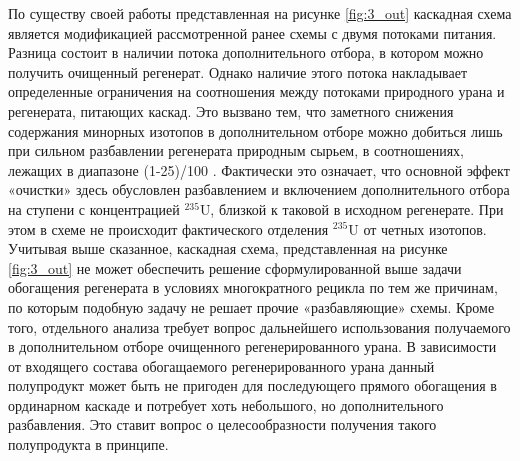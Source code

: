 По существу своей работы представленная на рисунке \ref{fig:3_out} каскадная схема является модификацией рассмотренной ранее схемы с двумя потоками питания. Разница состоит в наличии потока дополнительного отбора, в котором можно получить очищенный регенерат. Однако наличие этого потока накладывает определенные ограничения на соотношения между потоками природного урана и регенерата, питающих каскад. Это вызвано тем, что заметного снижения содержания минорных изотопов в дополнительном отборе можно добиться лишь при сильном разбавлении регенерата природным сырьем, в соотношениях, лежащих в диапазоне (1-25)/100 \cite{palkinSeparationUraniumIsotopes2010, smirnovKaskadnyeShemyZadachah2012}. Фактически это означает, что основной эффект «очистки» здесь обусловлен разбавлением и включением дополнительного отбора на ступени с концентрацией $^{235}$U, близкой к таковой в исходном регенерате. При этом в схеме не происходит фактического отделения $^{235}$U от четных изотопов.
Учитывая выше сказанное, каскадная схема, представленная на рисунке \ref{fig:3_out} не может обеспечить решение сформулированной выше задачи обогащения регенерата в условиях многократного рецикла по тем же причинам, по которым подобную задачу не решает прочие «разбавляющие» схемы. 
Кроме того, отдельного анализа требует вопрос дальнейшего использования получаемого в дополнительном отборе очищенного регенерированного урана. В зависимости от входящего состава обогащаемого регенерированного урана данный полупродукт может быть не пригоден для последующего прямого обогащения в ординарном каскаде и потребует хоть небольшого, но дополнительного разбавления. Это ставит вопрос о целесообразности получения такого полупродукта в принципе.





